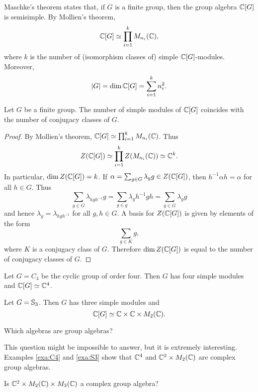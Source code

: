 
Maschke's theorem states that, if $G$ is a finite group, 
then the group algebra $\mathbb{C}[G]$ is semisimple. By Mollien's theorem, 
\[
\mathbb{C}[G]\simeq \prod_{i=1}^k M_{n_i}(\mathbb{C}),
\]
where $k$ is the number of (isomorphism classes of) 
simple $\mathbb{C}[G]$-modules. Moreover, 
\[
|G|=\dim\mathbb{C}[G]=\sum_{i=1}^k n_i^2.
\]

\begin{theorem}
    Let $G$ be a finite group. The number of simple 
    modules of $\mathbb{C}[G]$ coincides with the number of conjugacy classes of $G$. 
\end{theorem}

\begin{proof}
    By Mollien's theorem, $\mathbb{C}[G]\simeq\prod_{i=1}^kM_{n_i}(\mathbb{C})$. Thus 
    \[
		Z(\mathbb{C}[G])\simeq\prod_{i=1}^kZ(M_{n_i}(\mathbb{C}))\simeq\mathbb{C}^k.
	\]
	In particular, $\dim Z(\mathbb{C}[G])=k$. If $\alpha=\sum_{g\in
	G}\lambda_gg\in Z(\mathbb{C}[G])$, then $h^{-1}\alpha h=\alpha$ for all $h\in
	G$. Thus 
	\[
		\sum_{g\in G}\lambda_{hgh^{-1}}g=
		\sum_{g\in g}\lambda_g h^{-1}gh=\sum_{g\in G}\lambda_gg
	\]
	and hence $\lambda_{g}=\lambda_{hgh^{-1}}$ for all $g,h\in G$. A basis for 
	$Z(\mathbb{C}[G])$ is given by elements of the form 
	\[
		\sum_{g\in K}g,
	\]
	where $K$ is a conjugacy class of $G$. Therefore $\dim Z(\mathbb{C}[G])$ is equal to 
	the number of conjugacy classes of $G$.
\end{proof}

\begin{example}
\label{exa:C4}
    Let $G=C_4$ be the cyclic group of order four. Then
    $G$ has four simple modules and 
    $\mathbb{C}[G]\simeq\mathbb{C}^4$. 
\end{example}

\begin{example}
\label{exa:S3}
    Let $G=\mathbb{S}_3$. Then $G$ has three simple modules and
    \[
    \mathbb{C}[G]\simeq\mathbb{C}\times\mathbb{C}\times M_2(\mathbb{C}).
    \]
\end{example}

\begin{problem}[Brauer]
    Which algebras are group algebras? 
\end{problem}

This question might be impossible to answer, but it is extremely interesting. 
Examples \ref{exa:C4} and \ref{exa:S3} show
that $\mathbb{C}^4$ and $\mathbb{C}^2\times M_2(\mathbb{C})$ are complex group algebras. 

\begin{exercise}
    Is $\mathbb{C}^2\times M_2(\mathbb{C})\times M_3(\mathbb{C})$ a complex group algebra?  
\end{exercise}

